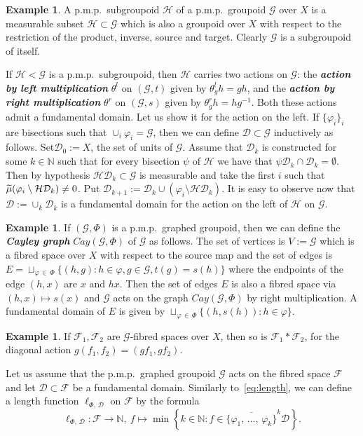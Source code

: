 \documentclass[10pt]{amsart}
\theoremstyle{definition}
\newtheorem{exam}[cdrthm]{Example}
\newcommand{\defin}[1]{\textbf{\emph{#1}}}
\newcommand{\Nmath}{\mathbb{N}}
\newcommand{\ch}{\mathcal{H}}
\newcommand{\cg}{\mathcal{G}}
\newcommand{\cf}{\mathcal{F}}
\newcommand{\cd}{\mathcal{D}}
\newcommand{\ph}{\varphi}
\newcommand{\pmp}{p.m.p.\ }
\let\oldtilde\tilde
\renewcommand*{\tilde}[1]{\mathchoice{\widetilde{#1}}{\widetilde{#1}}{\oldtilde{#1}}{\oldtilde{#1}}}
\begin{document}
\begin{exam}\label{ex:subgroupoid}
A \pmp subgroupoid $\ch$ of a \pmp groupoid $\cg$ over $X$ is a measurable subset $\ch\subset \cg$ which is also a groupoid over $X$ with respect to the restriction of the product, inverse, source and target. Clearly $\cg$ is a subgroupoid of itself.

If $\ch<\cg$ is a \pmp subgroupoid, then $\ch$ carries two actions on $\cg$: the
\defin{action by left multiplication} $\theta^l$ on $(\cg, t)$ given by $\theta^l_g h=gh$, and the
\defin{action by right multiplication} $\theta^r$ on $(\cg, s)$ given by $\theta^r_g h=hg^{-1}$. Both these actions admit a fundamental domain. Let us show it for the action on the left. If $\{\ph_i\}_i$ are bisections such that $\cup_i\ph_i=\cg$, then we can define $\cd\subset \cg$ inductively as follows. Set\linebreak$\cd_0:=X$, the set of units of $\cg$. Assume that $\cd_k$ is constructed for some $k\in\Nmath$ such that for every bisection $\psi$ of $\ch$ we have that $\psi\cd_k\cap \cd_k=\emptyset$. Then by hypothesis $\ch\cd_k\subset \cg$ is measurable and take the first $i$ such that $\tilde \mu(\ph_i\setminus\ch\cd_k)\neq 0$. Put $\cd_{k+1}:=\cd_k\cup (\ph_i\setminus \ch\cd_k)$. It is easy to observe now that $\cd:=\cup_k \cd_k$ is a fundamental domain for the action on the left of $\ch$ on $\cg$.
\end{exam}

\begin{exam}\label{ex:Cayley}
If $(\cg,\Phi)$ is a \pmp graphed groupoid, then we can define the
\defin{Cayley graph} $Cay(\cg,\Phi)$ of $\cg$ as follows. The set of vertices is $V:=\cg$ which is a fibred space over $X$ with respect to the source map and the set of edges is $E=\sqcup_{\varphi\,\in\,\Phi} \{(h,g):h\in\varphi, g\in \cg, t(g)=s(h)\}$ where the endpoints of the edge $(h,x)$ are $x$ and $h x$. Then the set of edges $E$ is also a fibred space via $(h,x)\mapsto s(x)$ and $\cg$ acts on the graph $Cay(\cg,\Phi)$ by right multiplication. A fundamental domain of $E$ is given by $\sqcup_{\varphi\,\in\,\Phi} \{(h,s(h)):h\in\varphi\}$.
\end{exam}

\begin{exam}\label{example:fibredProductAction}
If $\cf_1,\cf_2$ are $\cg$-fibred spaces over $X$, then so is $\cf_1\ast\cf_2$, for the diagonal action $g(f_1,f_2)=(gf_1,gf_2)$.
\end{exam}

Let us assume that the \pmp graphed groupoid $\cg$ acts on the fibred space $\cf$ and let $\cd\subset\cf$ be a fundamental domain. Similarly to~\eqref{eq:length}, we can define a length function $\ell_{\Phi,\,\cd}$ on $\cf$ by the formula
\begin{equation}\label{eq:lengthact}
\ell_{\Phi,\,\cd}:\cf\rightarrow \Nmath,\ f\mapsto \min\left\{ k\in\Nmath: f\in \overline{\{\ph_1,\,\dots,\,\ph_k\}}^k\cd\right\}.
\end{equation}
\end{document}
